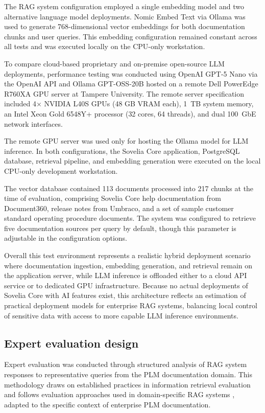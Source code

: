 The RAG system configuration employed a single embedding model and two alternative language model deployments. Nomic Embed Text via Ollama was used to generate 768-dimensional vector embeddings for both documentation chunks and user queries. This embedding configuration remained constant across all tests and was executed locally on the CPU-only workstation.

To compare cloud-based proprietary and on-premise open-source LLM deployments, performance testing was conducted using OpenAI GPT-5 Nano via the OpenAI API and Ollama GPT-OSS-20B hosted on a remote Dell PowerEdge R760XA GPU server at Tampere University. The remote server specification included 4$\times$ NVIDIA L40S GPUs (48 GB VRAM each), 1~TB system memory, an Intel Xeon Gold 6548Y+ processor (32 cores, 64 threads), and dual 100~GbE network interfaces.

The remote GPU server was used only for hosting the Ollama model for LLM inference. In both configurations, the Sovelia Core application, PostgreSQL database, retrieval pipeline, and embedding generation were executed on the local CPU-only development workstation.

The vector database contained 113 documents processed into 217 chunks at the time of evaluation, comprising Sovelia Core help documentation from Document360, release notes from Umbraco, and a set of sample customer standard operating procedure documents. The system was configured to retrieve five documentation sources per query by default, though this parameter is adjustable in the configuration options.

Overall this test environment represents a realistic hybrid deployment scenario where documentation ingestion, embedding generation, and retrieval remain on the application server, while LLM inference is offloaded either to a cloud API service or to dedicated GPU infrastructure. Because no actual deployments of Sovelia Core with AI features exist, this architecture reflects an estimation of practical deployment models for enterprise RAG systems, balancing local control of sensitive data with access to more capable LLM inference environments.

\subsection{Expert evaluation design}
\label{subsec:expert-evaluation-design}

Expert evaluation was conducted through structured analysis of RAG system responses to representative queries from the PLM documentation domain. This methodology draws on established practices in information retrieval evaluation \parencite{manningIntroductionInformationRetrieval2008a} and follows evaluation approaches used in domain-specific RAG systems \parencite{shejutiExtendedAbstractEnhancing2025, namLoRATunedMultimodalRAG2025}, adapted to the specific context of enterprise PLM documentation.

